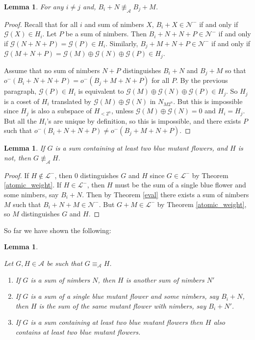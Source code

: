 \documentclass{amsart}
\theoremstyle{plain}
\newtheorem{lemma}[thm]{Lemma}
\theoremstyle{definition}
\theoremstyle{remark}
\numberwithin{equation}{section}
\numberwithin{thm}{section}
\begin{document}
\begin{lemma}
    \label{3}
    For any $i \neq j$ and, $B_i + N \not \equiv_{\mathscr{A}} B_j +M$. 
\end{lemma}
\begin{proof}
Recall that for all $i$ and sum of nimbers $X$, $B_i + X \in \mathcal{N}^-$ if and only if $\mathcal{G}(X) \in H_i$. Let $P$ be a sum of nimbers. Then $B_i+N+N+P \in \mathcal{N}^-$ if and only if $\mathcal{G}(N+N+P) = \mathcal{G}(P) \in H_i$. Similarly, $B_j+M+N+P \in \mathcal{N}^-$ if and only if $\mathcal{G}(M+N+P) = \mathcal{G}(M) \oplus \mathcal{G}(N) \oplus \mathcal{G}(P) \in {H}_j$. 

Assume that no sum of nimbers $N+P$ distinguishes $B_i + N$ and $B_j+M$ so that $o^-(B_i+N+N+P) = o^-(B_j+M+N+P)$ for all $P$. By the previous paragraph, $\mathcal{G}(P) \in H_i$ is equivalent to $\mathcal{G}(M) \oplus \mathcal{G}(N) \oplus \mathcal{G}(P) \in H_j$. So $H_j$ is a coset of $H_i$ translated by $\mathcal{G}(M) \oplus \mathcal{G}(N)$ in $N_{M2^n}$. But this is impossible since $H_j$ is also a subspace of $H_{<2^n}$, unless $\mathcal{G}(M) \oplus \mathcal{G}(N) = 0$ and $H_i = H_j$. But all the $H_i$'s are unique by definition, so this is impossible, and there exists $P$ such that $o^-(B_i+N+N+P) \neq o^-(B_j+M+N+P)$.
\end{proof}
\begin{lemma}
    \label{5}
    If $G$ is a sum containing at least two blue mutant flowers, and $H$ is not, then $G \not \equiv_{\mathscr{A}} H$.
\end{lemma}
\begin{proof}
If $H \notin \mathcal{L}^-$, then $0$ distinguishes $G$ and $H$ since $G \in \mathcal{L}^-$ by Theorem \ref{atomic_weight}. 
If $H \in \mathcal{L}^-$, then $H$ must be the sum of a single blue flower and some nimbers, say $B_i + N$. Then by Theorem \ref{eval} there exists a sum of nimbers $M$ such that $B_i+N+M \in \mathcal{N}^-$. But $G+M \in \mathcal{L}^-$ by Theorem \ref{atomic_weight}, so $M$ distinguishes $G$ and $H$.\end{proof}

So far we have shown the following: 

\begin{lemma}
\label{same weight}

Let $G,H\in\mathscr{A}$ be such that $G \equiv_{\mathscr{A}} H$.

\begin{enumerate}
    \item If $G$ is a sum of nimbers $N$, then $H$ is another sum of nimbers $N'$
    \item If $G$ is a sum of a single blue mutant flower and some nimbers, say $B_i+N$, then $H$ is the sum of the same mutant flower with nimbers, say $B_i + N'$.
    \item If $G$ is a sum containing at least two blue mutant flowers then $H$ also contains at least two blue mutant flowers.
\end{enumerate}    
\end{lemma}
\end{document}
